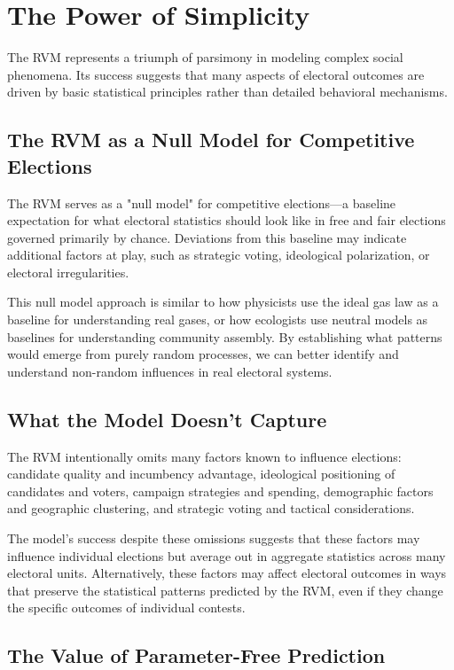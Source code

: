 \section{The Power of Simplicity}

The RVM represents a triumph of parsimony in modeling complex social phenomena. Its success suggests that many aspects of electoral outcomes are driven by basic statistical principles rather than detailed behavioral mechanisms.

\subsection{The RVM as a Null Model for Competitive Elections}

The RVM serves as a "null model" for competitive elections—a baseline expectation for what electoral statistics should look like in free and fair elections governed primarily by chance. Deviations from this baseline may indicate additional factors at play, such as strategic voting, ideological polarization, or electoral irregularities.

This null model approach is similar to how physicists use the ideal gas law as a baseline for understanding real gases, or how ecologists use neutral models as baselines for understanding community assembly. By establishing what patterns would emerge from purely random processes, we can better identify and understand non-random influences in real electoral systems.

\subsection{What the Model Doesn't Capture}

The RVM intentionally omits many factors known to influence elections: candidate quality and incumbency advantage, ideological positioning of candidates and voters, campaign strategies and spending, demographic factors and geographic clustering, and strategic voting and tactical considerations.

The model's success despite these omissions suggests that these factors may influence individual elections but average out in aggregate statistics across many electoral units. Alternatively, these factors may affect electoral outcomes in ways that preserve the statistical patterns predicted by the RVM, even if they change the specific outcomes of individual contests.

\subsection{The Value of Parameter-Free Prediction}

